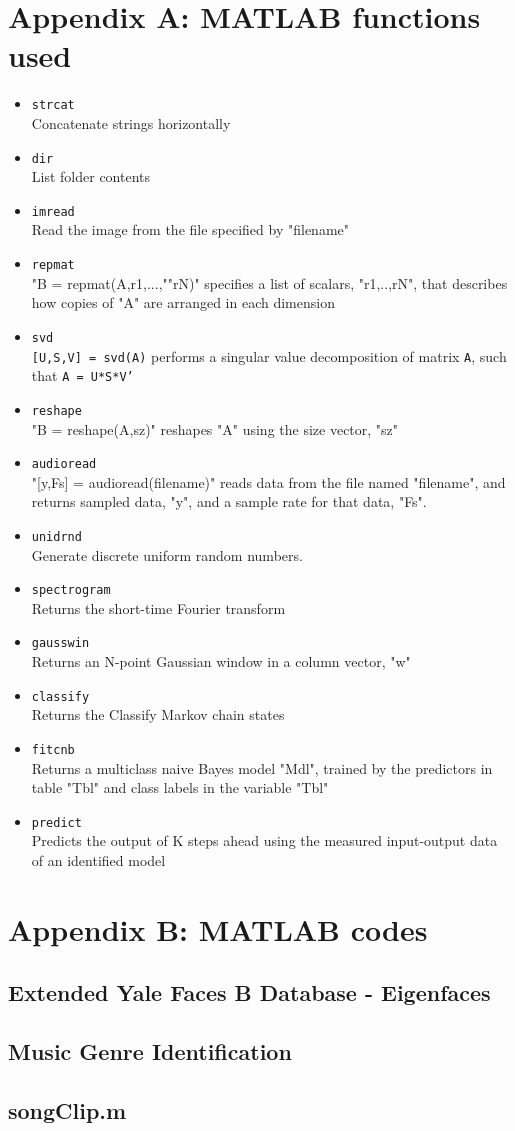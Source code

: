 \documentclass[11pt,a4paper]{article}
\numberwithin{equation}{subsection}
\begin{document}
\section*{Appendix A: MATLAB functions used}
	\begin{itemize}
		\item \texttt{strcat}\\
		Concatenate strings horizontally
		\item \texttt{dir}\\
		List folder contents
		\item \texttt{imread}\\
		Read the image from the file specified by "filename"
		\item \texttt{repmat}\\
		"B = repmat(A,r1,...,""rN)" specifies a list of scalars, "r1,..,rN", that describes how copies of "A" are arranged in each dimension
		\item \texttt{svd}\\
		\texttt{[U,S,V] = svd(A)} performs a singular value decomposition of matrix \texttt{A}, such that \texttt{A = U*S*V'}
		\item \texttt{reshape}\\
		"B = reshape(A,sz)" reshapes "A" using the size vector, "sz"
		\item \texttt{audioread}\\
		"[y,Fs] = audioread(filename)" reads data from the file named "filename", and returns sampled data, "y", and a sample rate for that data, "Fs".
		\item \texttt{unidrnd}\\
		Generate discrete uniform random numbers.
		\item \texttt{spectrogram}\\
		Returns the short-time Fourier transform
		\item \texttt{gausswin}\\
		Returns an N-point Gaussian window in a column vector, "w"
		\item \texttt{classify}\\
		Returns the Classify Markov chain states
		\item \texttt{fitcnb}\\
		Returns a multiclass naive Bayes model "Mdl", trained by the predictors in table "Tbl" and class labels in the variable "Tbl"
		\item \texttt{predict}\\
		Predicts the output of K steps ahead using the measured input-output data of an identified model 
	\end{itemize}


\section*{Appendix B: MATLAB codes}
\subsection*{Extended Yale Faces B Database - Eigenfaces}

\subsection*{Music Genre Identification}

\subsection*{songClip.m}

\end{document}
